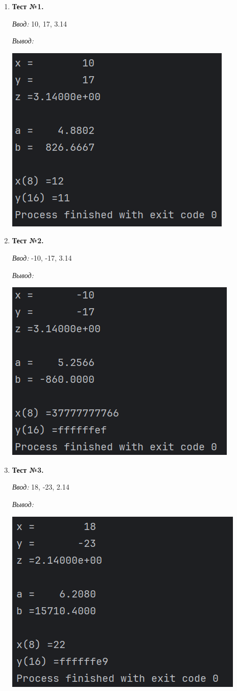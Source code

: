 \documentclass[12pt]{article}
\begin{document}
\begin{enumerate}

\item \textbf{Тест №1.} 

\textit{Ввод:} 10, 17, 3.14

\textit{Вывод:} 

\includegraphics{img1}

\item \textbf{Тест №2.}

\textit{Ввод:} -10, -17, 3.14

\textit{Вывод:} 

\includegraphics{img2}

\item \textbf{Тест №3.}

\textit{Ввод:} 18, -23, 2.14

\textit{Вывод:} 

\includegraphics{img3}

\end{enumerate}
\end{document}
